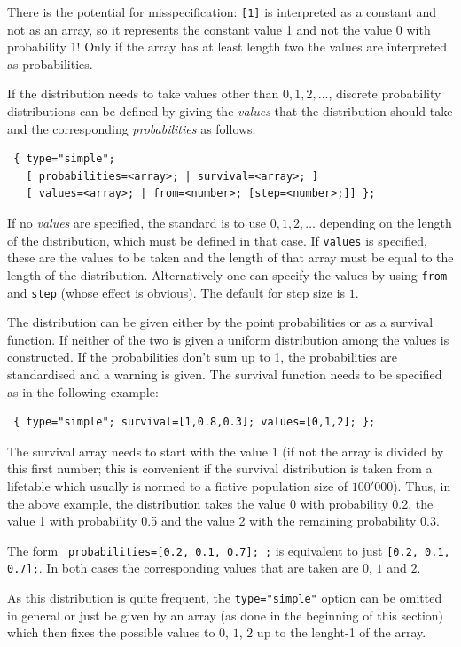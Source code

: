 \documentclass[11pt]{article}
\begin{document}
There is the potential for misspecification: \texttt{[1]} is interpreted as a constant and not as an array, so it represents the constant value 1 and not the value 0 with probability 1! Only if the array has at least length two the values are interpreted as probabilities.

If the distribution needs to take values other than $0, 1, 2, \dots$, discrete probability distributions can be defined by giving the \emph{values} that the distribution should take and the corresponding \emph{probabilities} as follows:
\begin{verbatim}
 { type="simple"; 
   [ probabilities=<array>; | survival=<array>; ]
   [ values=<array>; | from=<number>; [step=<number>;]] };
\end{verbatim}
If no \emph{values} are specified, the standard is to use $0,1,2,\dots$
depending on the length of the distribution, which must be defined in that case.
If \texttt{values} is specified, these are the values to be taken and the length
of that array must be equal to the length of the distribution. Alternatively one
can specify the values by using \texttt{from} and \texttt{step} (whose effect
is obvious). The default for step size is $1$. 

The distribution can be given either by the point probabilities or as a survival
function. If neither of the two is given a uniform distribution among the
values is constructed. If the probabilities don't sum up to 1, the
probabilities are standardised and a warning is given. The survival function
needs to be specified as in the following example:
\begin{verbatim}
 { type="simple"; survival=[1,0.8,0.3]; values=[0,1,2]; };
\end{verbatim}
The survival array needs to start with the value 1 (if not the array is divided
by this first number; this is convenient if the survival distribution is taken
from a lifetable which usually is normed to a fictive population size of
$100'000$). Thus, in the above example, the distribution takes the value $0$
with probability 0.2, the value 1 with probability 0.5 and the value 2 with the
remaining probability 0.3.

The form \texttt{ probabilities=[0.2, 0.1, 0.7];
;} is equivalent to just \texttt{[0.2, 0.1, 0.7];}. In both cases
the corresponding values that are taken are $0$, $1$ and $2$.

As this distribution is quite frequent, the \texttt{type="simple"} option can
be omitted in general or just be given by an array (as done in the
beginning of this section) which then fixes the possible values to $0$, $1$, $2$
up to the lenght-1 of the array.
\end{document}
